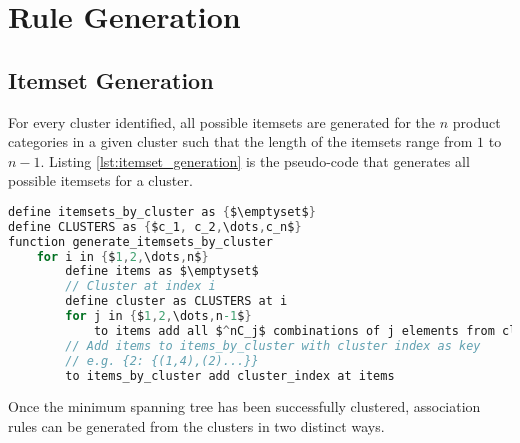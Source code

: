 \section{Rule Generation}

\subsection{Itemset Generation}
For every cluster identified, all possible itemsets are generated for the $n$ product categories in a given cluster such that the length of the itemsets range from $1$ to $n-1$. Listing \ref{lst:itemset_generation} is the pseudo-code that generates all possible itemsets for a cluster.



\begin{lstlisting}[language=C, mathescape=true, caption=Cluster Itemset Generation, label=lst:itemset_generation]
define itemsets_by_cluster as {$\emptyset$}
define CLUSTERS as {$c_1, c_2,\dots,c_n$}
function generate_itemsets_by_cluster
	for i in {$1,2,\dots,n$}
        define items as $\emptyset$
        // Cluster at index i
        define cluster as CLUSTERS at i
        for j in {$1,2,\dots,n-1$}
            to items add all $^nC_j$ combinations of j elements from cluster
        // Add items to items_by_cluster with cluster index as key
        // e.g. {2: {(1,4),(2)...}}
        to items_by_cluster add cluster_index at items
\end{lstlisting}
Once the minimum spanning tree has been successfully clustered, association rules can be generated from the clusters in two distinct ways.
